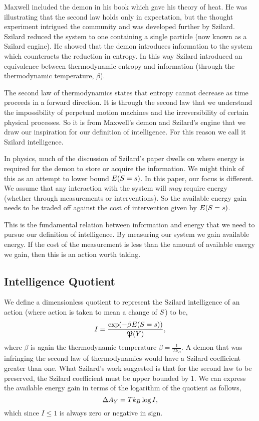 \documentclass[]{article}
\begin{document}
Maxwell included the demon in his book which gave his theory of heat\citep{Maxwell-theory71}. He was illustrating that the second law holds only in expectation, but the thought experiment intrigued the community and was developed further by Szilard\citep{Szilard-intelligenter29}. Szilard reduced the system to one containing a single particle (now known as a Szilard engine). He showed that the demon introduces information to the system which counteracts the reduction in entropy. In this way Szilard introduced an equivalence between thermodynamic entropy and information (through the thermodynamic temperature, $\beta$).

The second law of thermodynamics states that entropy cannot decrease as time proceeds in a forward direction. It is through the second law that we understand the impossibility of perpetual motion machines and the irreversibility of certain physical processes. So it is from Maxwell's demon and Szilard's engine that we draw our inspiration for our  definition of intelligence. For this reason we call it Szilard intelligence.

In physics, much of the discussion of Szilard's paper dwells on where energy is required for the demon to store or acquire the information. We might think of this as an attempt to lower bound $E(S=s)$. In this paper, our focus is different. We assume that any interaction with the system will \emph{may} require energy (whether through measurements or interventions). So the available energy gain needs to be traded off against the cost of intervention given by $E(S=s)$. 

This is the fundamental relation between information and energy that
we need to pursue our definition of intelligence. By measuring our
system we gain available energy. If the cost of the measurement is
less than the amount of available energy we gain, then this is an
action worth taking.

\subsection{Intelligence Quotient}

We define a dimensionless quotient to represent the Szilard intelligence of an action
(where action is taken to mean a change of $S$) to be,
\[
I = \frac{\exp(-\beta E(S=s))}{\mathfrak{P}(Y)},
\]
where $\beta$ is again the thermodynamic temperature \(\beta = \frac{1}{Tk_B}\). A demon that was infringing the second law of thermodynamics would have a Szilard coefficient greater than one. What Szilard's work suggested is that for the second law to be preserved, the Szilard coefficient must be upper bounded by 1. We can express the available energy gain in terms of the logarithm of the quotient as follows,
\[
\Delta A_Y = T k_B\log I,
\]
which since $I\leq 1$ is always zero or negative in sign. 
\end{document}
